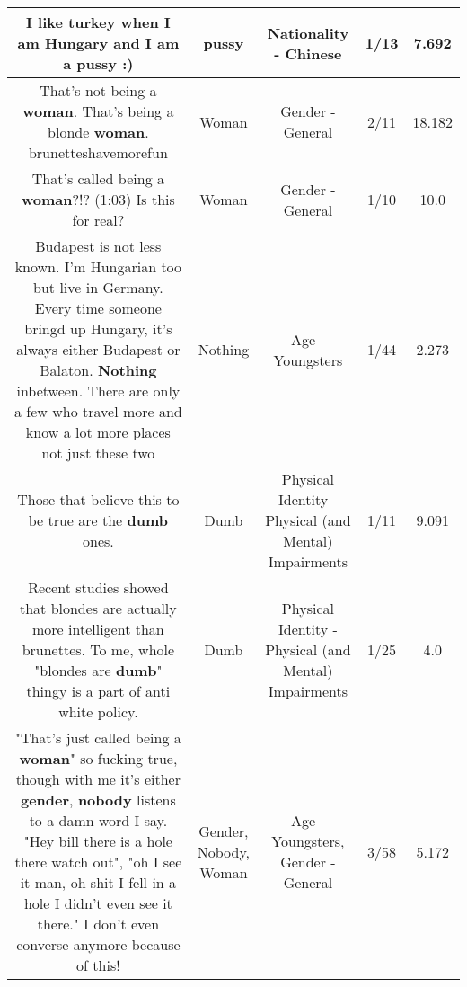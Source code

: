 \documentclass[11pt]{article}
\newlength\mylength
\begin{document}
\begin{center}
\begin{longtable}{|C{.65\mylength}|C{.30\mylength}|C{.12\mylength}|C{.12\mylength}|C{.12\mylength}|}
  \small I like turkey when I am Hungary and I am a \textbf{pussy} :)\normalsize   & pussy & Nationality - Chinese & 1/13 & 7.692 \\  \hline
  \small That's not being a \textbf{woman}. That's being a blonde \textbf{woman}. brunetteshavemorefun\normalsize   & Woman & Gender - General & 2/11 & 18.182 \\  \hline
  \small That's called being a \textbf{woman}?!? (1:03) Is this for real?\normalsize   & Woman & Gender - General & 1/10 & 10.0 \\  \hline
  \small Budapest is not less known. I'm Hungarian too but live in Germany. Every time someone bringd up Hungary, it's always either Budapest or Balaton. \textbf{Nothing} inbetween. There are only a few who travel more and know a lot more places not just these two\normalsize   & Nothing & Age - Youngsters & 1/44 & 2.273 \\  \hline
  \small Those that believe this to be true are the \textbf{dumb} ones.\normalsize   & Dumb & Physical Identity - Physical (and Mental) Impairments & 1/11 & 9.091 \\  \hline
  \small Recent studies showed that blondes are actually more intelligent than brunettes. To me, whole "blondes are \textbf{dumb}" thingy is a part of anti white policy.\normalsize   & Dumb & Physical Identity - Physical (and Mental) Impairments & 1/25 & 4.0 \\  \hline
  \small "That's just called being a \textbf{woman}" so fucking true, though with me it's either \textbf{gender}, \textbf{nobody} listens to a damn word I say. "Hey bill there is a hole there watch out", "oh I see it man, oh shit I fell in a hole I didn't even see it there." I don't even converse anymore because of this!\normalsize   & Gender, Nobody, Woman & Age - Youngsters, Gender - General & 3/58 & 5.172 \\  \hline

\end{longtable}
\end{center}
\end{document}
